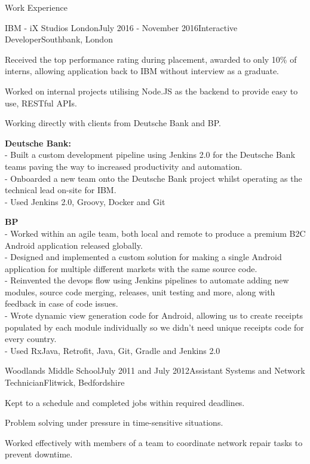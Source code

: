 \documentclass{resume} %
\begin{document}
\begin{rSection}{Work Experience}
	
\begin{rSubsection}{IBM - iX Studios London}{July 2016 - November 2016}{Interactive Developer}{Southbank, London}
	\item Received the top performance rating during placement, awarded to only 10\% of interns, allowing application back to IBM without interview as a graduate.
	\item Worked on internal projects utilising Node.JS as the backend to provide easy to use, RESTful APIs.
	\item Working directly with clients from Deutsche Bank and BP.
	\item \textbf{Deutsche Bank:}\\
	- Built a custom development pipeline using Jenkins 2.0 for the Deutsche Bank teams paving the way to increased productivity and automation.\\
	- Onboarded a new team onto the Deutsche Bank project whilst operating as the technical lead on-site for IBM.\\
	- Used Jenkins 2.0, Groovy, Docker and Git
	\item \textbf{BP}\\
	- Worked within an agile team, both local and remote to produce a premium B2C Android application released globally.\\
	- Designed and implemented a custom solution for making a single Android application for multiple different markets with the same source code.\\
	- Reinvented the devops flow using Jenkins pipelines to automate adding new modules, source code merging, releases, unit testing and more, along with feedback in case of code issues.\\
	- Wrote dynamic view generation code for Android, allowing us to create receipts populated by each module individually so we didn't need unique receipts code for every country.\\
	- Used RxJava, Retrofit, Java, Git, Gradle and Jenkins 2.0
\end{rSubsection}

\newpage
\begin{rSubsection}{Woodlands Middle School}{July 2011 and July 2012}{Assistant Systems and Network Technician}{Flitwick, Bedfordshire}
	\item Kept to a schedule and completed jobs within required deadlines.
	\item Problem solving under pressure in time-sensitive situations.
	\item Worked effectively with members of a team to coordinate network repair tasks to prevent downtime.
\end{rSubsection}


\end{rSection}
\end{document}
